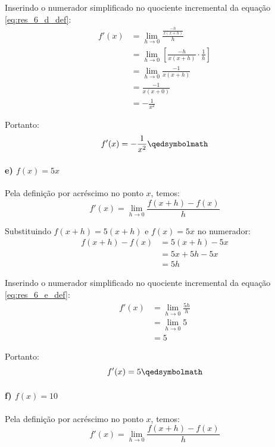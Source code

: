 Inserindo o numerador simplificado no quociente incremental da equação \eqref{eq:res_6_d_def}:
\begin{align*}
f'(x) &= \lim_{h \to 0} \frac{\frac{-h}{x(x + h)}}{h} \\
      &= \lim_{h \to 0} \left[ \frac{-h}{x(x + h)} \cdot \frac{1}{h} \right] \\
      &= \lim_{h \to 0} \frac{-1}{x(x + h)} \\
      &= \frac{-1}{x(x + 0)} \\
      &= -\frac{1}{x^2}
\end{align*}

Portanto:
\[
  f'(x) = -\frac{1}{x^2} \qedsymbolmath
\]

\setcounter{equation}{0}
\paragraph{e) $f(x) = 5x$}

Pela definição por acréscimo no ponto $x$, temos:
\begin{equation}
f'(x) = \lim_{h \to 0} \frac{f(x + h) - f(x)}{h} \label{eq:res_6_e_def}
\end{equation}

Substituindo $f(x + h) = 5(x + h)$ e $f(x) = 5x$ no numerador:
\begin{align*}
f(x + h) - f(x) &= 5(x + h) - 5x \\
&= 5x + 5h - 5x \\
&= 5h
\end{align*}

Inserindo o numerador simplificado no quociente incremental da equação \eqref{eq:res_6_e_def}:
\begin{align*}
f'(x) &= \lim_{h \to 0} \frac{5h}{h} \\
      &= \lim_{h \to 0} 5 \\
      &= 5
\end{align*}

Portanto:
\[
  f'(x) = 5 \qedsymbolmath
\]

\setcounter{equation}{0}
\paragraph{f) $f(x) = 10$}

Pela definição por acréscimo no ponto $x$, temos:
\begin{equation}
f'(x) = \lim_{h \to 0} \frac{f(x + h) - f(x)}{h} \label{eq:res_6_f_def}
\end{equation}

